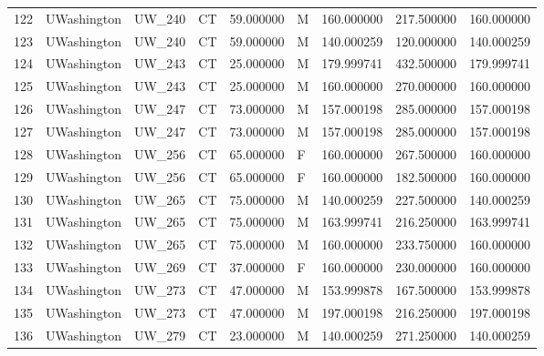 \begin{tabular}{llllrlrrr}
122    &     UWashington &       UW\_240 &                 CT &  59.000000 &        M &       160.000000 &    217.500000 &  160.000000 \\
123    &     UWashington &       UW\_240 &                 CT &  59.000000 &        M &       140.000259 &    120.000000 &  140.000259 \\
124    &     UWashington &       UW\_243 &                 CT &  25.000000 &        M &       179.999741 &    432.500000 &  179.999741 \\
125    &     UWashington &       UW\_243 &                 CT &  25.000000 &        M &       160.000000 &    270.000000 &  160.000000 \\
126    &     UWashington &       UW\_247 &                 CT &  73.000000 &        M &       157.000198 &    285.000000 &  157.000198 \\
127    &     UWashington &       UW\_247 &                 CT &  73.000000 &        M &       157.000198 &    285.000000 &  157.000198 \\
128    &     UWashington &       UW\_256 &                 CT &  65.000000 &        F &       160.000000 &    267.500000 &  160.000000 \\
129    &     UWashington &       UW\_256 &                 CT &  65.000000 &        F &       160.000000 &    182.500000 &  160.000000 \\
130    &     UWashington &       UW\_265 &                 CT &  75.000000 &        M &       140.000259 &    227.500000 &  140.000259 \\
131    &     UWashington &       UW\_265 &                 CT &  75.000000 &        M &       163.999741 &    216.250000 &  163.999741 \\
132    &     UWashington &       UW\_265 &                 CT &  75.000000 &        M &       160.000000 &    233.750000 &  160.000000 \\
133    &     UWashington &       UW\_269 &                 CT &  37.000000 &        F &       160.000000 &    230.000000 &  160.000000 \\
134    &     UWashington &       UW\_273 &                 CT &  47.000000 &        M &       153.999878 &    167.500000 &  153.999878 \\
135    &     UWashington &       UW\_273 &                 CT &  47.000000 &        M &       197.000198 &    216.250000 &  197.000198 \\
136    &     UWashington &       UW\_279 &                 CT &  23.000000 &        M &       140.000259 &    271.250000 &  140.000259 \\

\end{tabular}
